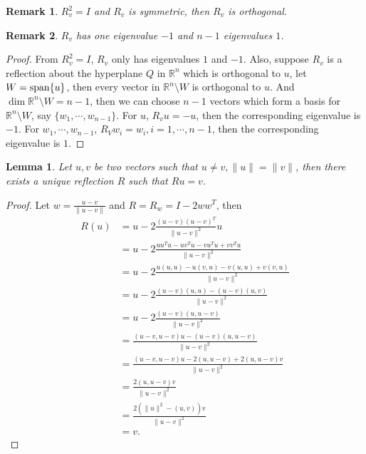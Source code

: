 \documentclass[11pt]{book}
\newtheorem{lemma}[theorem]{Lemma}
\newtheorem{remark}{Remark}[section]
\theoremstyle{definition}
\numberwithin{equation}{chapter}
\begin{document}
\begin{subappendices}
\begin{remark}
$R_v^2 = I$ and $R_v$ is symmetric, then $R_v$ is orthogonal.
\end{remark}

\begin{remark}\label{eigenvalue_of_reflection}
$R_v$ has one eigenvalue $-1$ and $n-1$ eigenvalues $1$.
\end{remark}
\begin{proof}
From $R_v^2 = I$, $R_v$ only has eigenvalues $1$ and $-1$. Also, suppose $R_v$ is a reflection about the hyperplane $Q$ in $\mathbb{R}^n$ which is orthogonal to $u$, let $W = {\rm  span}\{u\}$, then every vector in $\mathbb{R}^n\setminus W$ is orthogonal to $u$. And $\dim \mathbb{R}^n\setminus W = n - 1$, then we can choose $n - 1$ vectors which form a basis for $\mathbb{R}^n\setminus W$, say $\{w_1, \cdots, w_{n-1}\}$. For $u$, $R_v u = - u$, then the corresponding eigenvalue is $-1$. For $w_1, \cdots, w_{n-1}$, $R_V w_i = w_i, i = 1, \cdots, n-1$, then the corresponding eigenvalue is $1$.
\end{proof}

\medskip

\begin{lemma}{\rm \cite{35}}
Let $u, v$ be two vectors such that $u \neq v, \|u\| = \|v\|$, then there exists a unique reflection $R$ such that $Ru = v$.
\end{lemma}
\begin{proof}
Let $w = \frac{u-v}{\|u-v\|}$ and $R = R_w = I - 2 ww^T$, then
\begin{align*}
    R(u) & = u - 2 \frac{(u-v)(u-v)^T}{\|u-v\|^2}u \\
    & = u - 2 \frac{uu^Tu - uv^Tu - vu^Tu + vv^Tu}{\|u-v\|^2} \\
    & = u - 2 \frac{u(u,u) - u(v,u) - v(u,u) + v(v,u)}{\|u-v\|^2} \\
    & = u - 2 \frac{(u-v)(u,u) - (u-v)(u,v)}{\|u-v\|^2} \\
    & = u - 2 \frac{(u-v)(u,u-v)}{\|u-v\|^2} \\
    & = \frac{(u-v,u-v)u - (u-v)(u,u-v)}{\|u-v\|^2} \\
    & = \frac{(u-v,u-v)u - 2(u,u-v) + 2(u,u-v)v}{\|u-v\|^2} \\
    & = \frac{2(u,u-v)v}{\|u-v\|^2} \\
    & = \frac{2(\|u\|^2 - (u,v))v}{\|u-v\|^2} \\
    & = v.
\end{align*}


\end{proof}
\end{subappendices}
\end{document}
